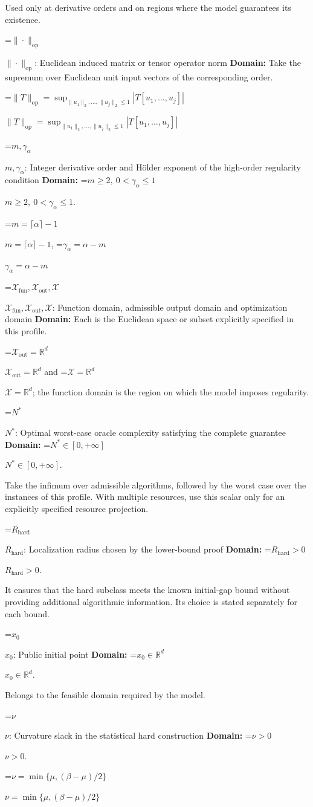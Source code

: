 \documentclass[10pt,a4paper]{article}
\newcommand{\AtlasMath}[1]{\par\begingroup\centering\setbox0=\hbox{$\displaystyle #1$}\ifdim\wd0>1.4\linewidth\typeout{ATLAS WIDE FORMULA: \the\wd0}\fi\ifdim\wd0>\linewidth\resizebox{\linewidth}{!}{\box0}\else\box0\fi\par\endgroup}
\newcommand{\AtlasInlineMath}[1]{\begingroup\setbox0=\hbox{$#1$}\ifdim\wd0>.4\linewidth\endgroup\AtlasMath{#1}\else\endgroup$#1$\fi}
\begin{document}
Used only at derivative orders and on regions where the model guarantees its existence.

\AtlasInlineMath{\|\cdot\|_{\mathrm{op}}}: Euclidean induced matrix or tensor operator norm \textbf{Domain:} Take the supremum over Euclidean unit input vectors of the corresponding order.

\AtlasInlineMath{\|T\|_{\mathrm{op}}=\sup_{\|u_1\|_2,\ldots,\|u_j\|_2\le1}|T[u_1,\ldots,u_j]|}

\AtlasInlineMath{m,\gamma_\alpha}: Integer derivative order and Hölder exponent of the high-order regularity condition \textbf{Domain:} \AtlasInlineMath{m\ge2,\ 0<\gamma_\alpha\le1}.

\AtlasInlineMath{m=\lceil\alpha\rceil-1}, \AtlasInlineMath{\gamma_\alpha=\alpha-m}

\AtlasInlineMath{\mathcal{X}_{\mathrm{fun}},\mathcal{X}_{\mathrm{out}},\mathcal{X}}: Function domain, admissible output domain and optimization domain \textbf{Domain:} Each is the Euclidean space or subset explicitly specified in this profile.

\AtlasInlineMath{\mathcal{X}_{\mathrm{out}}=\mathbb{R}^d} and \AtlasInlineMath{\mathcal{X}=\mathbb{R}^d}; the function domain is the region on which the model imposes regularity.

\AtlasInlineMath{N^*}: Optimal worst-case oracle complexity satisfying the complete guarantee \textbf{Domain:} \AtlasInlineMath{N^*\in[0,+\infty]}.

Take the infimum over admissible algorithms, followed by the worst case over the instances of this profile. With multiple resources, use this scalar only for an explicitly specified resource projection.

\AtlasInlineMath{R_{\mathrm{hard}}}: Localization radius chosen by the lower-bound proof \textbf{Domain:} \AtlasInlineMath{R_{\mathrm{hard}}>0}.

It ensures that the hard subclass meets the known initial-gap bound without providing additional algorithmic information. Its choice is stated separately for each bound.

\AtlasInlineMath{x_0}: Public initial point \textbf{Domain:} \AtlasInlineMath{x_0\in\mathbb{R}^d}.

Belongs to the feasible domain required by the model.

\AtlasInlineMath{\nu}: Curvature slack in the statistical hard construction \textbf{Domain:} \AtlasInlineMath{\nu>0}.

\AtlasInlineMath{\nu=\min\{\mu,(\beta-\mu)/2\}}
\end{document}
